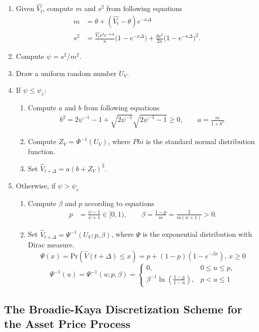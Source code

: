 \documentclass{ws-ijfe}
\begin{document}
\begin{enumerate}
\item Given $\hat{V_t}$, compute $m$ and $s^2$ from following equations
\begin{align*}
  m &=\theta + (\hat{V_t}-\theta)e^{-\kappa\Delta} \\
  s^2 &=\frac{\hat{V_t}\nu^2 e^{-\kappa\Delta}}{\kappa}\bigg(1-e^{-\kappa\Delta}\bigg)+\frac{\theta\nu^2}{2\kappa}\bigg(1-e^{-\kappa\Delta}\bigg)^2.
\end{align*}
\item Compute $\psi=s^2/m^2$.
\item Draw a uniform random number $U_V$.
\item If $\psi\leq\psi_c$:
\begin{enumerate}
\item Compute $a$ and $b$ from following equations
\begin{align*}
b^2=2\psi^{-1}-1+\sqrt{2\psi^{-1}}\sqrt{2\psi^{-1}-1}\geq 0, \qquad a =\frac{m}{1+b^2}.
\end{align*}
\item Compute $Z_V=\Phi^{-1}(U_V)$, where $Phi$ is the standard normal distribution function.
\item Set $\hat{V}_{t+\Delta}=a(b+Z_V)^2$.
\end{enumerate}
\item Otherwise, if $\psi>\psi_c$
\begin{enumerate}
  \item Compute $\beta$ and $p$ according to equations
  \begin{align*}
    p & =\frac{\psi-1}{\psi+1}\in[0,1), \qquad%
    \beta =\frac{1-p}{m}=\frac{2}{m(\psi+1)}>0.
  \end{align*}
  \item Set $\hat{V}_{t+\Delta}=\Psi^{-1}(U_V;p,\beta)$, where $\Psi$ is the exponential distribution with Dirac measure.
  \begin{equation*}
    \Psi(x) = \text{Pr}(\hat{V}(t+\Delta)\leq x) = p+(1-p)(1-e^{-\beta x}),\, x\geq 0
  \end{equation*}
  \[
  \Psi^{-1}(u)=\Psi^{-1}(u;p,\beta)=
  \begin{cases}
    0,\,&0\leq u \leq p,\\
    \beta^{-1}\ln(\frac{1-p}{1-u}),&p<u\leq1
  \end{cases}
  \]
\end{enumerate}
\end{enumerate}

\subsection{The Broadie-Kaya Discretization Scheme for the Asset Price Process}
\end{document}
